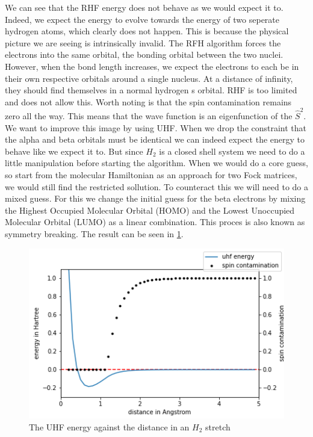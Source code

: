 \documentclass[twoside,twocolumn,9pt]{article}
\begin{document}
We can see that the RHF energy does not behave as we would expect it to. Indeed, we expect the energy to evolve towards the energy of two seperate hydrogen atoms, which clearly does
not happen. This is because the physical picture we are seeing is intrinsically invalid. The RFH algorithm forces the electrons into the same orbital, the bonding orbital between
the two nuclei. However, when the bond length increases, we expect the electrons to each be in their own respective orbitals around a single nucleus. At a distance of infinity, they
should find themselves in a normal hydrogen s orbital. RHF is too limited and does not allow this. Worth noting is that the spin contamination remains zero all the way. This means
that the wave function is an eigenfunction of the $\hat{S}^2$\cite{Scuseria2011}. \\
We want to improve this image by using UHF.  When we drop the constraint that the alpha and beta orbitals must be identical we can indeed expect the energy to behave like we expect
it to. But since $H_2$ is a closed shell system we need to do a little manipulation before starting the algorithm. When we would do a core guess, so start from the molecular
Hamiltonian as an approach for two Fock matrices, we would still find the restricted sollution. To counteract this we will need to do a mixed guess. For this we change the initial
guess for the beta electrons by mixing the Highest Occupied Molecular Orbital (HOMO) and the Lowest Unoccupied Molecular Orbital (LUMO) as a linear combination. This proces is also
known as symmetry breaking. The result can be seen in \ref{fig:uhfstretch}.

\begin{center}
  \begin{figure}[h]
    \includegraphics[width=\linewidth]{./../notes/figures/uhf.png}
    \caption{The UHF energy against the distance in an $H_2$ stretch}
    \label{fig:uhfstretch}
  \end{figure}
\end{center}
\end{document}
